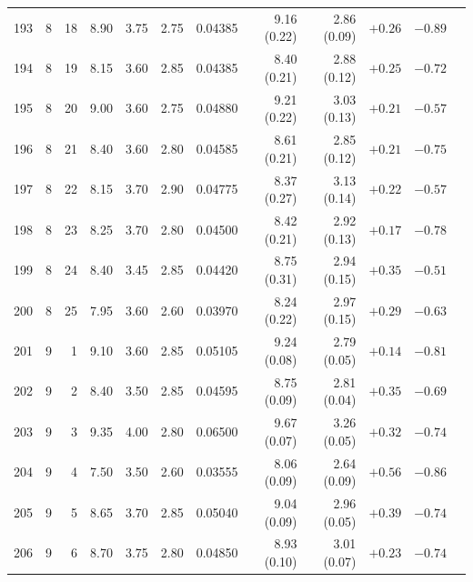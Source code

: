 \begin{longtable}{@{}rrrrrrrrrrrr@{}}
193 & 8 & 18 & \num{8.90} & \num{3.75} & \num{2.75} & \num{0.04385} & \num{9.16} (\num{0.22}) & \num{2.86} (\num{0.09}) & $+\num{0.26}$ & $-\num{0.89}$ &  \\
194 & 8 & 19 & \num{8.15} & \num{3.60} & \num{2.85} & \num{0.04385} & \num{8.40} (\num{0.21}) & \num{2.88} (\num{0.12}) & $+\num{0.25}$ & $-\num{0.72}$ &  \\
195 & 8 & 20 & \num{9.00} & \num{3.60} & \num{2.75} & \num{0.04880} & \num{9.21} (\num{0.22}) & \num{3.03} (\num{0.13}) & $+\num{0.21}$ & $-\num{0.57}$ &  \\
196 & 8 & 21 & \num{8.40} & \num{3.60} & \num{2.80} & \num{0.04585} & \num{8.61} (\num{0.21}) & \num{2.85} (\num{0.12}) & $+\num{0.21}$ & $-\num{0.75}$ &  \\
197 & 8 & 22 & \num{8.15} & \num{3.70} & \num{2.90} & \num{0.04775} & \num{8.37} (\num{0.27}) & \num{3.13} (\num{0.14}) & $+\num{0.22}$ & $-\num{0.57}$ &  \\
198 & 8 & 23 & \num{8.25} & \num{3.70} & \num{2.80} & \num{0.04500} & \num{8.42} (\num{0.21}) & \num{2.92} (\num{0.13}) & $+\num{0.17}$ & $-\num{0.78}$ &  \\
199 & 8 & 24 & \num{8.40} & \num{3.45} & \num{2.85} & \num{0.04420} & \num{8.75} (\num{0.31}) & \num{2.94} (\num{0.15}) & $+\num{0.35}$ & $-\num{0.51}$ &  \\
200 & 8 & 25 & \num{7.95} & \num{3.60} & \num{2.60} & \num{0.03970} & \num{8.24} (\num{0.22}) & \num{2.97} (\num{0.15}) & $+\num{0.29}$ & $-\num{0.63}$ &  \\
201 & 9 & 1 & \num{9.10} & \num{3.60} & \num{2.85} & \num{0.05105} & \num{9.24} (\num{0.08}) & \num{2.79} (\num{0.05}) & $+\num{0.14}$ & $-\num{0.81}$ &  \\
202 & 9 & 2 & \num{8.40} & \num{3.50} & \num{2.85} & \num{0.04595} & \num{8.75} (\num{0.09}) & \num{2.81} (\num{0.04}) & $+\num{0.35}$ & $-\num{0.69}$ &  \\
203 & 9 & 3 & \num{9.35} & \num{4.00} & \num{2.80} & \num{0.06500} & \num{9.67} (\num{0.07}) & \num{3.26} (\num{0.05}) & $+\num{0.32}$ & $-\num{0.74}$ &  \\
204 & 9 & 4 & \num{7.50} & \num{3.50} & \num{2.60} & \num{0.03555} & \num{8.06} (\num{0.09}) & \num{2.64} (\num{0.09}) & $+\num{0.56}$ & $-\num{0.86}$ &  \\
205 & 9 & 5 & \num{8.65} & \num{3.70} & \num{2.85} & \num{0.05040} & \num{9.04} (\num{0.09}) & \num{2.96} (\num{0.05}) & $+\num{0.39}$ & $-\num{0.74}$ &  \\
206 & 9 & 6 & \num{8.70} & \num{3.75} & \num{2.80} & \num{0.04850} & \num{8.93} (\num{0.10}) & \num{3.01} (\num{0.07}) & $+\num{0.23}$ & $-\num{0.74}$ &  \\

\end{longtable}
